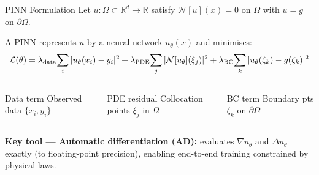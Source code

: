 \documentclass[aspectratio=169,10pt]{beamer}
\begin{document}
\begin{frame}{PINN Formulation}
  Let $u:\Omega\subset\mathbb{R}^d\to\mathbb{R}$ satisfy
  $\mathcal{N}[u](x)=0$ on $\Omega$ with $u=g$ on $\partial\Omega$.
  \medskip

  A PINN represents $u$ by a neural network $u_\theta(x)$ and minimises:
  \begin{equation*}
    \mathcal{L}(\theta)
    = \lambda_{\rm data}\!\sum_i|u_\theta(x_i)-y_i|^2
    + \lambda_{\rm PDE}\!\sum_j|\mathcal{N}[u_\theta](\xi_j)|^2
    + \lambda_{\rm BC}\!\sum_k|u_\theta(\zeta_k)-g(\zeta_k)|^2
  \end{equation*}

  \begin{columns}[T]
      \begin{block}{Data term}
        Observed data $\{x_i,y_i\}$
      \end{block}
      \begin{block}{PDE residual}
        Collocation points $\xi_j$ in $\Omega$
      \end{block}
      \begin{block}{BC term}
        Boundary pts $\zeta_k$ on $\partial\Omega$
      \end{block}
  \end{columns}

  \vspace{0.4cm}
  \textbf{Key tool — Automatic differentiation (AD):} evaluates
  $\nabla u_\theta$ and $\Delta u_\theta$ exactly (to floating-point
  precision), enabling end-to-end training constrained by physical laws.
\end{frame}

\end{document}
